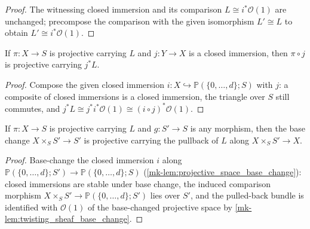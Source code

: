\begin{proof}
  \leanok
  The witnessing closed immersion and its comparison
  \(L \cong i^* \mathcal{O}(1)\) are unchanged; precompose the comparison with
  the given isomorphism \(L' \cong L\) to obtain \(L' \cong i^*
  \mathcal{O}(1)\).
\end{proof}

\begin{lemma}
  \label{mk-lem:projective_with_closed_immersion}
  \leanok
  If \(\pi : X \to S\) is projective carrying \(L\) and \(j : Y \to X\) is a
  closed immersion, then \(\pi \circ j\) is projective carrying \(j^* L\).
\end{lemma}

\begin{proof}
  \leanok
  Compose the given closed immersion \(i : X \hookrightarrow
  \mathbb{P}(\{0,\dots,d\}; S)\) with \(j\): a composite of closed
  immersions is a closed immersion, the triangle over \(S\) still commutes,
  and \(j^* L \cong j^* i^* \mathcal{O}(1) \cong (i \circ j)^*
  \mathcal{O}(1)\).
\end{proof}

\begin{lemma}
  \label{mk-lem:projective_with_base_change}
  \leanok
  If \(\pi : X \to S\) is projective carrying \(L\) and \(g : S' \to S\) is
  any morphism, then the base change \(X \times_S S' \to S'\) is projective
  carrying the pullback of \(L\) along \(X \times_S S' \to X\).
\end{lemma}

\begin{proof}
  \leanok
  Base-change the closed immersion \(i\) along
  \(\mathbb{P}(\{0,\dots,d\}; S') \to \mathbb{P}(\{0,\dots,d\}; S)\)
  (\ref{mk-lem:projective_space_base_change}): closed immersions are stable
  under base change, the induced comparison morphism
  \(X \times_S S' \to \mathbb{P}(\{0,\dots,d\}; S')\) lies over \(S'\), and
  the pulled-back bundle is identified with \(\mathcal{O}(1)\) of the
  base-changed projective space by \ref{mk-lem:twisting_sheaf_base_change}.
\end{proof}

